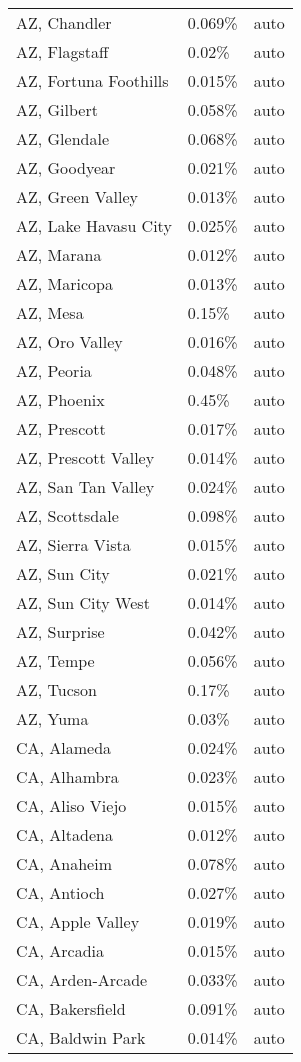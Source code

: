 \begin{longtable}[]{@{}lll@{}}
AZ, Chandler & 0.069\% & auto \\
AZ, Flagstaff & 0.02\% & auto \\
AZ, Fortuna Foothills & 0.015\% & auto \\
AZ, Gilbert & 0.058\% & auto \\
AZ, Glendale & 0.068\% & auto \\
AZ, Goodyear & 0.021\% & auto \\
AZ, Green Valley & 0.013\% & auto \\
AZ, Lake Havasu City & 0.025\% & auto \\
AZ, Marana & 0.012\% & auto \\
AZ, Maricopa & 0.013\% & auto \\
AZ, Mesa & 0.15\% & auto \\
AZ, Oro Valley & 0.016\% & auto \\
AZ, Peoria & 0.048\% & auto \\
AZ, Phoenix & 0.45\% & auto \\
AZ, Prescott & 0.017\% & auto \\
AZ, Prescott Valley & 0.014\% & auto \\
AZ, San Tan Valley & 0.024\% & auto \\
AZ, Scottsdale & 0.098\% & auto \\
AZ, Sierra Vista & 0.015\% & auto \\
AZ, Sun City & 0.021\% & auto \\
AZ, Sun City West & 0.014\% & auto \\
AZ, Surprise & 0.042\% & auto \\
AZ, Tempe & 0.056\% & auto \\
AZ, Tucson & 0.17\% & auto \\
AZ, Yuma & 0.03\% & auto \\
CA, Alameda & 0.024\% & auto \\
CA, Alhambra & 0.023\% & auto \\
CA, Aliso Viejo & 0.015\% & auto \\
CA, Altadena & 0.012\% & auto \\
CA, Anaheim & 0.078\% & auto \\
CA, Antioch & 0.027\% & auto \\
CA, Apple Valley & 0.019\% & auto \\
CA, Arcadia & 0.015\% & auto \\
CA, Arden-Arcade & 0.033\% & auto \\
CA, Bakersfield & 0.091\% & auto \\
CA, Baldwin Park & 0.014\% & auto \\

\end{longtable}
